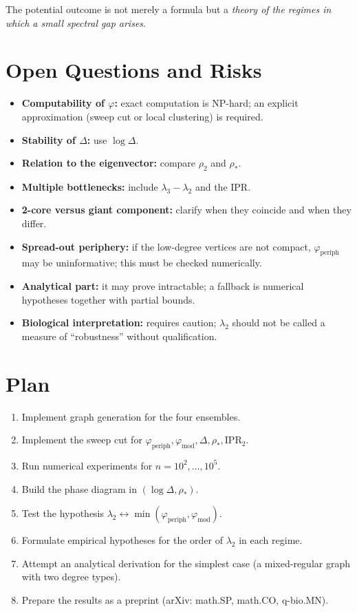 \documentclass[11pt,a4paper]{article}
\theoremstyle{plain}
\theoremstyle{definition}
\theoremstyle{remark}
\newcommand{\periph}{\mathrm{periph}}
\newcommand{\modu}{\mathrm{mod}}
\newcommand{\Ph}{\varphi}
\newcommand{\lamtwo}{\lambda_2}
\newcommand{\lamthree}{\lambda_3}
\begin{document}
The potential outcome is not merely a formula but a \emph{theory of the regimes
in which a small spectral gap arises}.

\section{Open Questions and Risks}
\label{sec:open}

\begin{itemize}[leftmargin=*]
\item \textbf{Computability of $\Ph$:} exact computation is NP-hard; an explicit
approximation (sweep cut or local clustering) is required.
\item \textbf{Stability of $\Delta$:} use $\log\Delta$.
\item \textbf{Relation to the eigenvector:} compare $\rho_2$ and $\rho_*$.
\item \textbf{Multiple bottlenecks:} include $\lamthree-\lamtwo$ and the IPR.
\item \textbf{2-core versus giant component:} clarify when they coincide and
when they differ.
\item \textbf{Spread-out periphery:} if the low-degree vertices are not
compact, $\Ph_{\periph}$ may be uninformative; this must be checked numerically.
\item \textbf{Analytical part:} it may prove intractable; a fallback is
numerical hypotheses together with partial bounds.
\item \textbf{Biological interpretation:} requires caution; $\lamtwo$ should not
be called a measure of ``robustness'' without qualification.
\end{itemize}

\section{Plan}
\label{sec:plan}

\begin{enumerate}[leftmargin=*]
\item Implement graph generation for the four ensembles.
\item Implement the sweep cut for
$\Ph_{\periph},\Ph_{\modu},\Delta,\rho_*,\mathrm{IPR}_2$.
\item Run numerical experiments for $n=10^2,\dots,10^5$.
\item Build the phase diagram in $(\log\Delta,\rho_*)$.
\item Test the hypothesis
$\lamtwo\leftrightarrow\min(\Ph_{\periph},\Ph_{\modu})$.
\item Formulate empirical hypotheses for the order of $\lamtwo$ in each regime.
\item Attempt an analytical derivation for the simplest case (a
mixed-regular graph with two degree types).
\item Prepare the results as a preprint (arXiv: math.SP, math.CO, q-bio.MN).
\end{enumerate}
\end{document}
